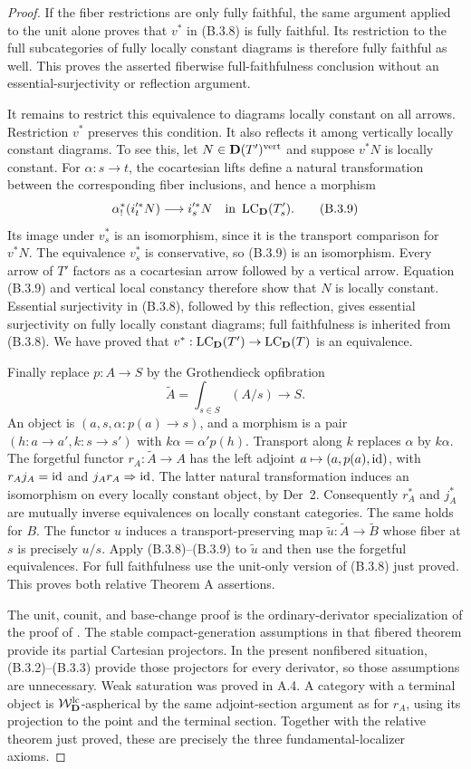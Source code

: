 \begin{proof}
If the fiber restrictions are only fully faithful, the same argument
applied to the unit alone proves that $v^*$ in (B.3.8) is fully
faithful. Its restriction to the full subcategories of fully locally
constant diagrams is therefore fully faithful as well. This proves
the asserted fiberwise full-faithfulness conclusion without an
essential-surjectivity or reflection argument.

It remains to restrict this equivalence to diagrams locally constant
on all arrows. Restriction $v^*$ preserves this condition. It also
reflects it among vertically locally constant diagrams. To see this,
let $N\in\mathbf D(T')^{\mathrm{vert}}$ and suppose $v^*N$ is locally
constant. For $\alpha:s\to t$, the cocartesian lifts define a
natural transformation between the corresponding fiber inclusions,
and hence a morphism
\[
 \alpha_!^*(i_t'^*N)\longrightarrow i_s'^*N
 \quad\hbox{in }\operatorname{LC}_\mathbf D(T'_s).
 \tag{B.3.9}
\]
Its image under $v_s^*$ is an isomorphism, since it is the transport
comparison for $v^*N$. The equivalence $v_s^*$ is conservative, so
(B.3.9) is an isomorphism. Every arrow of $T'$ factors as a
cocartesian arrow followed by a vertical arrow. Equation (B.3.9)
and vertical local constancy therefore show that $N$ is locally
constant. Essential surjectivity in (B.3.8), followed by this
reflection, gives essential surjectivity on fully locally constant
diagrams; full faithfulness is inherited from (B.3.8). We have proved
that $v^*:\operatorname{LC}_\mathbf D(T')\to\operatorname{LC}_\mathbf D(T)$ is an equivalence.

Finally replace $p:A\to S$ by the Grothendieck opfibration
\[
 \widetilde A=\int_{s\in S}(A/s)\longrightarrow S.
 \tag{B.3.10}
\]
An object is $(a,s,\alpha:p(a)\to s)$, and a morphism is a pair
$(h:a\to a',k:s\to s')$ with $k\alpha=\alpha'p(h)$.
Transport along $k$ replaces $\alpha$ by $k\alpha$. The forgetful
functor $r_A:\widetilde A\to A$ has the left adjoint
$a\mapsto(a,p(a),\mathrm{id})$, with $r_Aj_A=\mathrm{id}$ and
$j_Ar_A\Rightarrow\mathrm{id}$. The latter natural transformation induces
an isomorphism on every locally constant object, by Der~2.
Consequently $r_A^*$ and $j_A^*$ are mutually inverse equivalences
on locally constant categories. The same holds for $B$. The functor
$u$ induces a transport-preserving map
$\widetilde u:\widetilde A\to\widetilde B$ whose fiber at $s$
is precisely $u/s$. Apply (B.3.8)--(B.3.9) to $\widetilde u$ and
then use the forgetful equivalences. For full faithfulness use the
unit-only version of (B.3.8) just proved. This proves both relative
Theorem A assertions.

The unit, counit, and base-change proof is the ordinary-derivator
specialization of the proof of
\citet[Main Theorem~2.5.5(2), pp.~52--54]{EF_Hoermann2015}.
The stable compact-generation assumptions in that fibered theorem
provide its partial Cartesian projectors. In the present
nonfibered situation, (B.3.2)--(B.3.3) provide those projectors for
every derivator, so those assumptions are unnecessary. Weak
saturation was proved in A.4. A category with a terminal object is
$\mathcal W_{\mathbf D}^{\mathrm{lc}}$-aspherical by the same adjoint-section argument as for
$r_A$, using its projection to the point and the terminal section.
Together with the relative theorem just proved, these are precisely
the three fundamental-localizer axioms.
\end{proof}
